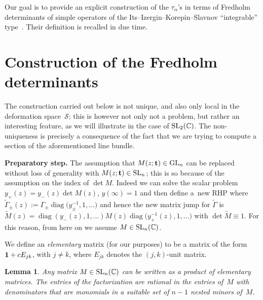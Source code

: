 \documentclass[pdftex]{sigma}
\numberwithin{equation}{section}
\newtheorem{Lemma}[Theorem]{Lemma}
\def\wt{\widetilde}
\def \G{\Gamma}
\def\C{{\mathbb C}}
\def\1{{\bf 1}}
\def \t{\mathbf t}
\begin{document}
Our goal is to provide an explicit construction of the $\tau_\alpha$'s in terms of Fredholm determinants of simple operators of the Its--Izergin--Korepin--Slavnov ``integrable'' type~\cite{ItsIzerginKorepinSlavnov}. Their def\/inition is recalled in due time.

\section{Construction of the Fredholm determinants}

The construction carried out below is not unique, and also only local in the deformation space~$\mathcal S$; this is however not only not a problem, but rather an interesting feature, as we will illustrate in the case of ${\rm SL}_2(\C)$. The non-uniqueness is precisely a consequence of the fact that we are trying to compute a section of the aforementioned line bundle.

{\bf Preparatory step.} The assumption that $M(z;\t)\in {\rm GL}_n$ can be replaced without loss of generality with $M(z;\t)\in {\rm SL}_n$; this is so because of the assumption on the index of $\det M$. Indeed we can solve the scalar problem $y_+ (z) =y_-(z) \det M(z)$, $y(\infty)=1$ and then def\/ine a~new RHP where $\wt \G_\pm (z) := \G_\pm \operatorname{diag}\big(y_\pm^{-1} , 1,\dots\big)$ and hence the new matrix jump for $\wt \G$ is $\wt M (z)= \operatorname{diag}(y_-(z) , 1,\dots) M(z) \operatorname{diag}\big(y_+^{-1}(z) , 1,\dots\big) $ with $\det \wt M \equiv 1$. For this reason, from here on we assume $M\in {\rm SL}_n(\C)$.

We def\/ine an {\it elementary} matrix (for our purposes) to be a matrix of the form $\1 + cE_{jk}$, with $j\neq k$, where $E_{jk}$ denotes the $(j,k)$-unit matrix.

\begin{Lemma}\label{lemmafactor}
Any matrix $M\in {\rm SL}_n(\C)$ can be written as a product of elementary matrices. The entries of the factorization are rational in the entries of~$M$ with denominators that are monomials in a suitable set of $n-1$ nested minors of~$M$.
\end{Lemma}
\end{document}
